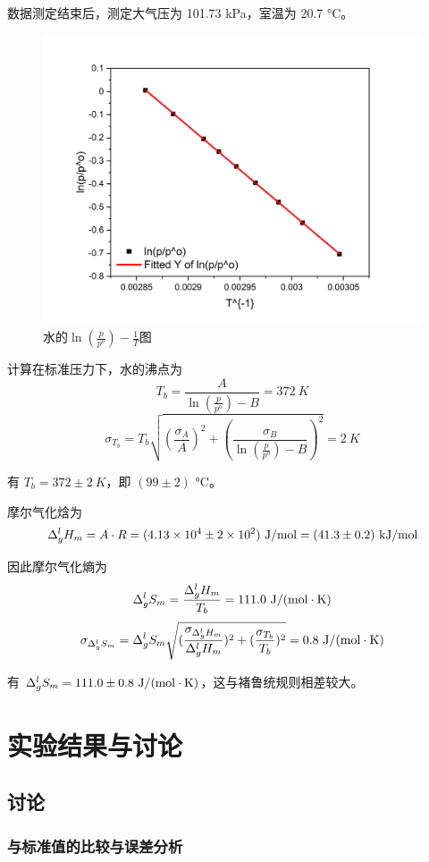 \documentclass[cn,hazy,pku,12pt,normal,math=newtx,cite=super]{elegantnote}
\begin{document}
数据测定结束后，测定大气压为 101.73 kPa，室温为 20.7 °C。

\begin{figure}[htbp]
    \centering
    \includegraphics[width = .70\textwidth]{image/Graph4.png}
    \caption{水的$\ln(\frac{p}{p^o}) - \frac{1}{T}$图}\label{3}
\end{figure}


计算在标准压力下，水的沸点为
$$
T_b = \frac{A}{\ln(\frac{p}{p^o})-B} = 372\ K
$$
$$
\sigma_{T_b} = T_b\sqrt{(\frac{\sigma_A}{A})^2+(\frac{\sigma_B}{\ln(\frac{p}{p^o})-B})^2} = 2\ K
$$

有 $T_b = 372 \pm 2\ K$，即 $(99 \pm 2)$ °C。

摩尔气化焓为
$$
\Delta^l_g H_m = A \cdot R = (4.13 \times 10^4 \pm 2 \times 10^2) \ {\rm J/mol} = (41.3 \pm 0.2) \ {\rm kJ/mol}
$$

因此摩尔气化熵为
$$
\Delta^l_g S_m = \frac{\Delta^l_g H_m}{T_b} = 111.0\ {\rm J/(mol \cdot K)}
$$
$$
\sigma_{\Delta^l_g S_m} = \Delta^l_g S_m\sqrt{(\frac{\sigma_{\Delta^l_g H_m}}{\Delta^l_g H_m})^2+(\frac{\sigma_{T_b}}{T_b})^2} = 0.8\ {\rm J/(mol \cdot K)}
$$

有 $\Delta^l_g S_m = 111.0 \pm 0.8\ {\rm J/(mol\cdot K)}$，这与褚鲁统规则相差较大。


\section{实验结果与讨论}

\subsection{讨论}
\subsubsection{与标准值的比较与误差分析}
\end{document}

